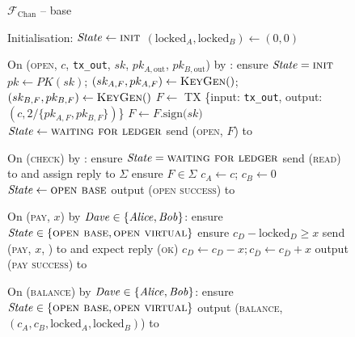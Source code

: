 \begin{figure}[H]
  \begin{systembox}{$\mathcal{F}_{\mathrm{Chan}}$ -- base}
    \begin{algorithmic}[1]
      \State Initialisation: 
      \Indent
        \State $\mathit{State} \gets \textsc{init}$
        \State $(\mathrm{locked}_A, \mathrm{locked}_B) \gets (0, 0)$
      \EndIndent
      \Statex

      \State On (\textsc{open}, $c$, \texttt{tx\_out}, $sk$, $pk_{A,
      \mathrm{out}}$, $pk_{B, \mathrm{out}}$) by
      \alice:
      \Indent
        \State ensure $\mathit{State} = \textsc{init}$
        \State $pk \gets PK(sk)$; $(sk_{A, F}, pk_{A, F}) \gets
        \textsc{KeyGen}()$; $(sk_{B, F}, pk_{B, F}) \gets \textsc{KeyGen}()$
        \State $F \gets$ TX \{input: \texttt{tx\_out}, output: $(c, 2/\{pk_{A,
        F}, pk_{B, F}\})$\}
        \State $F \gets F\mathrm{.sign(}sk\mathrm{)}$
        \State $\mathit{State} \gets \textsc{waiting for ledger}$
        \State send (\textsc{open}, $F$) to \adversary
      \EndIndent
      \Statex

      \State On (\textsc{check}) by \environment:
      \Indent
        \State ensure $\mathit{State} = \textsc{waiting for ledger}$
        \State send (\textsc{read}) to \ledger and assign reply to $\Sigma$
        \State ensure $F \in \Sigma$
        \State $c_A \gets c$; $c_B \gets 0$
        \State $\mathit{State} \gets \textsc{open base}$
        \State output (\textsc{open success}) to \environment
      \EndIndent
      \Statex

      \State On (\textsc{pay}, $x$) by $\mathit{Dave} \in \{\mathit{Alice}, \mathit{Bob}\}$:
      \Indent
        \State ensure $\mathit{State} \in \{\textsc{open base}, \textsc{open
        virtual}\}$
        \State ensure $c_D - \mathrm{locked}_D \geq x$
        \State send (\textsc{pay}, $x$, \dave) to \adversary and expect reply
        (\textsc{ok})
        \State $c_D \gets c_D - x; c_{\bar{D}} \gets c_{\bar{D}} + x$
        \State output (\textsc{pay success}) to \dave
      \EndIndent
      \Statex

      \State On (\textsc{balance}) by $\mathit{Dave} \in \{\mathit{Alice}, \mathit{Bob}\}$:
      \Indent
        \State ensure $\mathit{State} \in \{\textsc{open base}, \textsc{open
        virtual}\}$
        \State output (\textsc{balance}, $(c_A, c_B, \mathrm{locked}_A,
        \mathrm{locked}_B)$) to \dave %
      \EndIndent
    \end{algorithmic}
  \end{systembox}
  \caption{}
  \label{code:functionality:chan:skeleton:base}
\end{figure}

